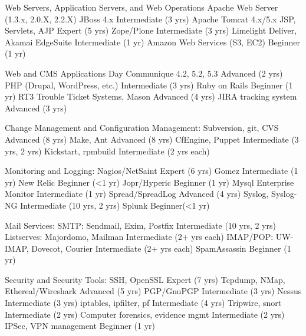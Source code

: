 \documentclass{article}
\begin{document}
Web Servers, Application Servers, and Web Operations
   Apache Web Server (1.3.x, 2.0.X, 2.2.X)
   JBoss 4.x                                 Intermediate (3 yrs)
   Apache Tomcat 4.x/5.x
   JSP, Servlets, AJP                        Expert (5 yrs)
   Zope/Plone                                Intermediate (3 yrs)
   Limelight Deliver, Akamai EdgeSuite       Intermediate (1 yr)
   Amazon Web Services (S3, EC2)             Beginner (1 yr)

Web and CMS Applications
   Day Communique 4.2, 5.2, 5.3              Advanced (2 yrs)
   PHP (Drupal, WordPress, etc.)             Intermediate (3 yrs)
   Ruby on Rails                             Beginner (1 yr)
   RT3 Trouble Ticket Systems, Mason         Advanced (4 yrs)
   JIRA tracking system                      Advanced (3 yrs)

Change Management and Configuration Management: 
   Subversion, git, CVS                      Advanced (8 yrs)
   Make, Ant                                 Advanced (8 yrs)
   CfEngine, Puppet                          Intermediate (3 yrs, 2 yrs)
   Kickstart, rpmbuild                       Intermediate (2 yrs each)
   
Monitoring and Logging: 
   Nagios/NetSaint                           Expert (6 yrs)
   Gomez                                     Intermediate (1 yr)
   New Relic                                 Beginner (<1 yr)
   Jopr/Hyperic                              Beginner (1 yr)
   Mysql Enterprise Monitor                  Intermediate (1 yr)
   Spread/SpreadLog                          Advanced (4 yrs)
   Syslog, Syslog-NG                         Intermediate (10 yrs, 2 yrs)
   Splunk                                    Beginner(<1 yr)

Mail Services:
   SMTP: Sendmail, Exim, Postfix             Intermediate (10 yrs, 2 yrs)
   Listserves: Majordomo, Mailman            Intermediate (2+ yrs each)
   IMAP/POP: UW-IMAP, Dovecot, Courier       Intermediate (2+ yrs each)
   SpamAssassin                              Beginner (1 yr)

Security and Security Tools: 
   SSH, OpenSSL                              Expert (7 yrs)
   Tcpdump, NMap, Ethereal/Wireshark         Advanced (5 yrs)
   PGP/GnuPGP                                Intermediate (3 yrs)
   Nessus                                    Intermediate (3 yrs)
   iptables, ipfilter, pf                    Intermediate (4 yrs)
   Tripwire, snort                           Intermediate (2 yrs)
   Computer forensics, evidence mgmt         Intermediate (2 yrs)
   IPSec, VPN management                     Beginner (1 yr)
\end{document}
